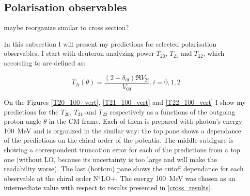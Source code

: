 
        
    \subsection{Polarisation observables}
    \label{tensor_results}

    {\color{red} maybe  reorganize similar to cross section?}


    In this subsection I will present my predictions for 
    selected polarisation observables.
    I start with deuteron analyzing power $T_{20}$, $T_{21}$ and $T_{22}$,
    which according to \cite{ArenhovelPhotodisint1991} are defined as:
    
    \begin{equation}
        T_{2i} (\theta) = \frac{(2 - \delta_{i0}) \Re V_{2i}}{V_{00}}, i=0,1,2
    \end{equation}

    On the Figures \ref{T20_100_vert}, \ref{T21_100_vert} and 
    \ref{T22_100_vert} I show my predictions for the
    $T_{20}$, $T_{21}$ and $T_{22}$ respectively as a functions 
    of the outgoing proton angle $\theta$ in the CM frame. Each of them
    is prepared with photon's energy 100~MeV and is
    organized in the similar way: the top
    pane shows a dependance of the predictions on the 
    chiral order of the potentia. The middle subfigure is
    showing a correspondent truncation error for each of the 
    predictions from a top one (without LO, because its uncertainty is
    too large and will make the readability worse). The last (bottom)
    pane shows the cutoff dependance for each observable at the chiral
    order N$^4$LO+. The energy 100~MeV was chosen as 
    an intermediate value with respect to results presented in \ref{cross_results}.

